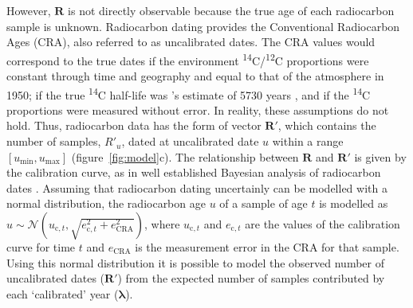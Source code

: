 \documentclass[a4paper]{article}
\begin{document}
However, $\bm{R}$ is not directly observable because the true age of each radiocarbon sample is unknown. Radiocarbon dating provides the Conventional Radiocarbon Ages (CRA), also referred to as uncalibrated dates. The CRA values would correspond to the true dates if the environment \textsuperscript{14}C/\textsuperscript{12}C proportions were constant through time and geography and equal to that of the atmosphere in 1950; if the true \textsuperscript{14}C half-life was \citeauthor{Libby1949}'s \parencite*{Libby1949} estimate of 5730 years \parencite{BronkRamsey2008}, and if the \textsuperscript{14}C proportions were measured without error. In reality, these assumptions do not hold. Thus, radiocarbon data has the form of vector $\bm{R'}$, which contains the number of samples, $R'_u$, dated at uncalibrated date $u$ within a range $\left[u_{\mathrm{min}},u_{\mathrm{max}}\right]$ (figure~\ref{fig:model}c). The relationship between $\bm{R}$ and $\bm{R'}$ is given by the calibration curve, as in well established Bayesian analysis of radiocarbon dates \parencite{BronkRamsey2008}. Assuming that radiocarbon dating uncertainly can be modelled with a normal distribution, the radiocarbon age $u$ of a sample of age $t$ is modelled as $u \sim \mathcal{N}\left(u_{\mathrm{c},t},\sqrt{e_{\mathrm{c},t}^2+e_{\mathrm{CRA}}^2}\right)$, where $u_{\mathrm{c},t}$ and $e_{\mathrm{c},t}$ are the values of the calibration curve for time $t$ and $e_{\mathrm{CRA}}$ is the measurement error in the CRA for that sample. Using this normal distribution it is possible to model the observed number of uncalibrated dates ($\bm{R'}$) from the expected number of samples contributed by each `calibrated' year ($\bm{\lambda}$).
\\


\end{document}

